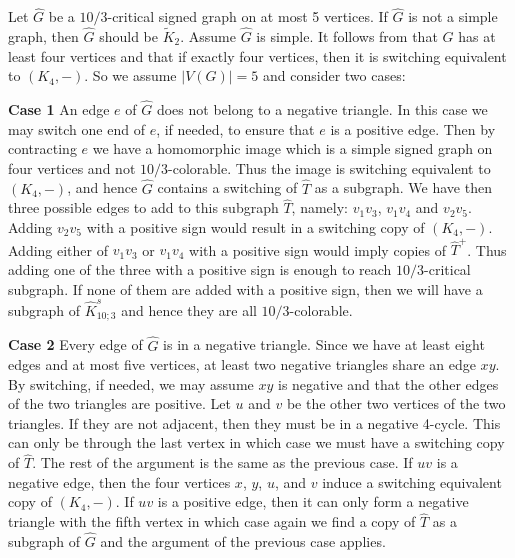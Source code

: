 \documentclass[11pt,a4paper]{article}
\makeatletter
\renewenvironment{proof}[1][\proofname]{\par
	\pushQED{\qed}%
	\normalfont \topsep6\p@\@plus6\p@\relax
	\trivlist
	\item[\hskip\labelsep
	\bfseries
	#1\@addpunct{.}]\ignorespaces
}{%
	\popQED\endtrivlist\@endpefalse
}
\theoremstyle{definition}
\makeatother
\begin{document}
	\begin{proof}
		
		Let $\widehat{G}$ be a $10/3$-critical signed graph on at most 5 vertices. If $\widehat{G}$ is not a simple graph, then $\widehat{G}$ should be $\widetilde{K}_2$. Assume $\widehat{G}$ is simple. It follows from   that $\widehat{G}$ has at least four vertices and that if exactly four vertices, then it is switching equivalent to $(K_4,-)$. So we assume $|V(G)|=5$ and consider two cases: 
		
		{\bf Case 1} An edge $e$ of $\widehat{G}$ does not belong to a negative triangle. In this case we may switch one end of $e$, if needed, to ensure that $e$ is a positive edge. Then by contracting $e$ we have a homomorphic image which is a simple signed graph on four vertices and not $10/3$-colorable. Thus the image is switching equivalent to $(K_4,-)$, and hence $\widehat{G}$ contains a switching of $\widehat{T}$ as a subgraph.  We have then three possible edges to add to this subgraph $\widehat{T}$, namely: $v_{1}v_{3}$, $v_{1}v_{4}$ and $v_{2}v_{5}$. Adding $v_{2}v_{5}$ with a positive sign would result in a switching copy of $(K_4,-)$. Adding either of $v_{1}v_{3}$ or $v_{1}v_{4}$ with a positive sign would imply copies of $\widehat{T}^+$. Thus adding one of the three with a  positive sign is enough to reach $10/3$-critical subgraph. If none of them are added with a positive sign, then we will have a subgraph of $\widehat{K}^s_{10;3}$ and hence they are all $10/3$-colorable. 
		
		{\bf Case 2} Every edge of $\widehat{G}$ is in a negative triangle. Since we have at least eight edges and at most five vertices, at least two negative triangles share an edge $xy$. By switching, if needed, we may assume $xy$ is negative and that the other edges of the two triangles are positive. Let $u$ and $v$ be the other two vertices of the two triangles. If they are not adjacent, then they must be in a negative 4-cycle. This can only be through the last vertex in which case we must have a switching copy of $\widehat{T}$. The rest of the argument is the same as the previous case. If $uv$ is a negative edge, then the four vertices $x$, $y$, $u$, and $v$ induce a switching equivalent copy of $(K_4, -)$. If $uv$ is a positive edge, then it can only form a negative triangle with the fifth vertex in which case again we find a copy of $\widehat{T}$ as a subgraph of $\widehat{G}$ and the argument of the previous case applies.  	
	\end{proof}
	
\end{document}
